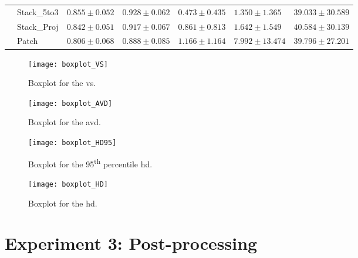 \begin{sidewaystable}[htbp]
\begin{tabular}{l*{6}{l}}
                & Stack\_5to3  & $0.855 \pm 0.052$ & $0.928 \pm 0.062$ & $\mathbf{0.473 \pm 0.435}$ & $\mathbf{1.350  \pm 1.365} $ & $39.033 \pm 30.589$ \\                
                & Stack\_Proj  & $0.842 \pm 0.051$ & $0.917 \pm 0.067$ & $0.861 \pm 0.813$ & $1.642  \pm 1.549 $ & $40.584 \pm 30.139$ \\
                & Patch & $0.806 \pm 0.068$ & $0.888 \pm 0.085$ & $1.166 \pm 1.164$ & $7.992  \pm 13.474$ & $39.796 \pm 27.201$ \\
      \bottomrule
   \end{tabular}
   \label{tab:results_3d_context}
\end{sidewaystable}


\begin{figure}[htbp]
	\centering
	\texttt{[image: boxplot\_VS]}
    \caption[Boxplot for the \acrlong{vs} for 3D Context]{Boxplot for the \acrlong{vs}.}
    \label{fig:results_boxplot_vs}
\end{figure}
\begin{figure}[htbp]
	\centering
	\texttt{[image: boxplot\_AVD]}
    \caption[Boxplot for the \acrlong{avd} for 3D Context]{Boxplot for the \acrlong{avd}.}
    \label{fig:results_boxplot_avd}
\end{figure}
\begin{figure}[htbp]	
	\centering
	\texttt{[image: boxplot\_HD95]}
    \caption[Boxplot for the \acrlong{hd95} for 3D Context]{Boxplot for the 95\textsuperscript{th} percentile \acrlong{hd}.}
    \label{fig:results_boxplot_hd95}
\end{figure}
\begin{figure}[htbp]	
	\centering
	\texttt{[image: boxplot\_HD]}
    \caption[Boxplot for the \acrlong{hd} for 3D Context]{Boxplot for the \acrlong{hd}.}
    \label{fig:results_boxplot_hd}
\end{figure}

\section{Experiment 3: Post-processing} %

